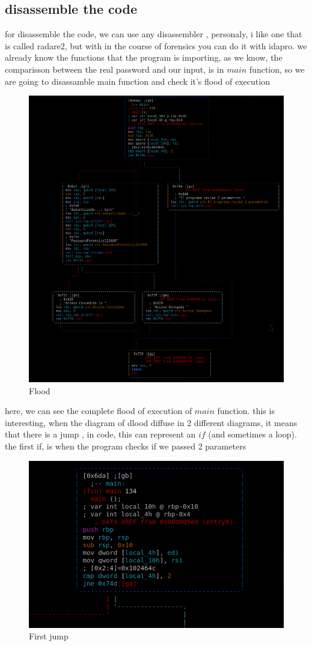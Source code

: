 \documentclass[10pt,a4paper]{article} %
\begin{document}
        \subsection{disassemble the code}
            \newpage
            for disassemble the code, we can use any disassembler , personaly,
            i like one that is called radare2, but with in the course of
            forensics you can do it with idapro. we already know the functions
            that the program is importing, as we know, the comparisson between
            the real password and our input, is in $ main  $ function, so we
            are going to disassamble main function and check it's flood of
            execution
            \begin{figure}[h!]
                \centering
                \includegraphics[width=0.8\linewidth]{flood.png}
                \caption{Flood}
                \label{flood}
            \end{figure}
            \newpage
            here, we can see the complete flood of execution of $ main  $
            function. this is interesting, when the diagram of dlood diffuse in
            2 different diagrams, it means that there is a jump , in code, this
            can represent an $ if  $ (and sometimes a loop). the first if, is
            when the program checks if we passed 2 parameters
            \\
            \begin{figure}[h!]
                \centering
                \includegraphics[width=0.5\linewidth]{primerif.png}
                \caption{First jump}
                \label{fig:primerif}
            \end{figure}
\end{document}
